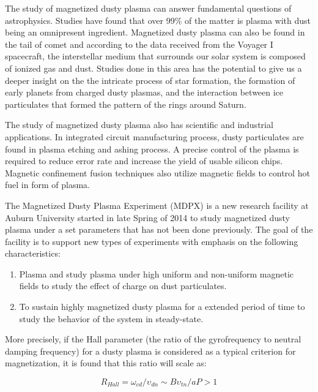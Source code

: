 The study of magnetized dusty plasma can answer fundamental questions of astrophysics. Studies have found that over 99\% of the matter is plasma with dust being an omnipresent ingredient\cite{shukla2010introduction}. Magnetized dusty plasma can also be found in the tail of comet\cite{niedner1978interplanetary} and according to the data received from the Voyager I spacecraft, the interstellar medium that surrounds our solar system is composed of ionized gas and dust\cite{website:Weiss2013voyager, website:Cook2013voyager, burke1983gas}. Studies done in this area has the potential to give us a deeper insight on the the intricate process of star formation\cite{mestel1956star}, the formation of early planets from charged dusty plasmas, and the interaction between ice particulates that formed the pattern of the rings around Saturn\cite{gurnett1983micron, goertz1983model}.

The study of magnetized dusty plasma also has scientific and industrial applications. In integrated circuit manufacturing process, dusty particulates are found in plasma etching and ashing process. A precise control of the plasma is required to reduce error rate and increase the yield of usable silicon chips. Magnetic confinement fusion techniques also utilize magnetic fields to control hot fuel in form of plasma.

The Magnetized Dusty Plasma Experiment (MDPX) is a new research facility at Auburn University started in late Spring of 2014 to study magnetized dusty plasma under a set parameters that has not been done previously. The goal of the facility is to support new types of experiments with emphasis on the following characteristics:

\begin{enumerate}
\item Plasma and study plasma under high uniform and non-uniform magnetic fields to study the effect of charge on dust particulates.
\item To sustain highly magnetized dusty plasma for a extended period of time to study the behavior of the system in steady-state.
\end{enumerate}

More precisely, if the Hall parameter (the ratio of the gyrofrequency to neutral damping frequency) for a dusty plasma is considered as a typical criterion for magnetization, it is found that this ratio will scale as:

\begin{equation}\label{hall_parameter}
R_{Hall} = \omega_{cd} / \upsilon_{dn} \sim B \upsilon_{tn} / a P > 1
\end{equation}

